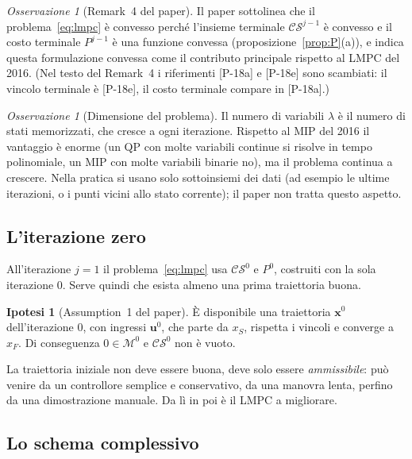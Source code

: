 \documentclass[11pt,a4paper]{article}
\theoremstyle{definition}
\newtheorem{ipotesi}[definizione]{Ipotesi}
\theoremstyle{plain}
\theoremstyle{remark}
\newtheorem{osservazione}[definizione]{Osservazione}
\newcommand{\CS}{\mathcal{CS}}
\newcommand{\Mc}{\mathcal{M}}
\newcommand{\eqp}[1]{\textup{[P-#1]}}   %
\newcommand{\vett}[1]{\mathbf{#1}}
\begin{document}
\begin{osservazione}[Remark~4 del paper]
Il paper sottolinea che il problema~\eqref{eq:lmpc} è convesso perché
l'insieme terminale $\CS^{j-1}$ è convesso e il costo terminale $P^{j-1}$ è una
funzione convessa (proposizione~\ref{prop:P}(a)), e indica questa
formulazione convessa come il contributo principale rispetto al LMPC del 2016.
(Nel testo del Remark~4 i riferimenti \eqp{18a} e \eqp{18e} sono scambiati:
il vincolo terminale è \eqp{18e}, il costo terminale compare in \eqp{18a}.)
\end{osservazione}

\begin{osservazione}[Dimensione del problema]
Il numero di variabili $\lambda$ è il numero di stati memorizzati, che cresce
a ogni iterazione. Rispetto al MIP del 2016 il vantaggio è enorme (un QP con
molte variabili continue si risolve in tempo polinomiale, un MIP con molte
variabili binarie no), ma il problema continua a crescere. Nella pratica si
usano solo sottoinsiemi dei dati (ad esempio le ultime iterazioni, o i punti
vicini allo stato corrente); il paper non tratta questo aspetto.
\end{osservazione}

\subsection{L'iterazione zero}

All'iterazione $j=1$ il problema~\eqref{eq:lmpc} usa $\CS^0$ e $P^0$, costruiti
con la sola iterazione $0$. Serve quindi che esista almeno una prima
traiettoria buona.

\begin{ipotesi}[Assumption~1 del paper]\label{ip:iterazione-zero}
È disponibile una traiettoria $\vett{x}^0$ dell'iterazione $0$, con ingressi
$\vett{u}^0$, che parte da $x_S$, rispetta i vincoli e converge a $x_F$. Di
conseguenza $0\in\Mc^0$ e $\CS^0$ non è vuoto.
\end{ipotesi}

La traiettoria iniziale non deve essere buona, deve solo essere
\emph{ammissibile}: può venire da un controllore semplice e conservativo, da
una manovra lenta, perfino da una dimostrazione manuale. Da lì in poi è il
LMPC a migliorare.

\subsection{Lo schema complessivo}
\end{document}
